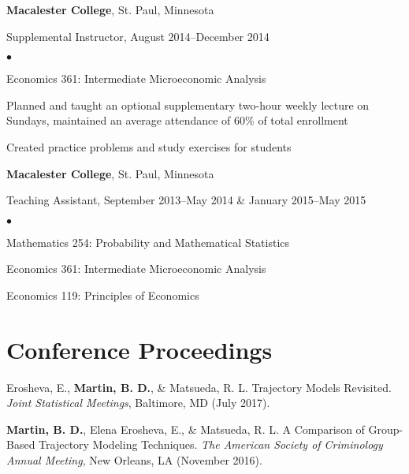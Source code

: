 \documentclass[margin,centered]{res}
\newenvironment{list1}{
  \begin{list}{\ding{113}}{%
      \setlength{\itemsep}{0in}
      \setlength{\parsep}{0in} \setlength{\parskip}{0in}
      \setlength{\topsep}{0in} \setlength{\partopsep}{0in}
      \setlength{\leftmargin}{0.17in}}}{\end{list}}
\newenvironment{list2}{
  \begin{list}{$\bullet$}{%
      \setlength{\itemsep}{0in}
      \setlength{\parsep}{0in} \setlength{\parskip}{0in}
      \setlength{\topsep}{0in} \setlength{\partopsep}{0in}
      \setlength{\leftmargin}{0.2in}}}{\end{list}}
\begin{document}
\begin{resume}
{\bf Macalester College}, St. Paul, Minnesota
\begin{list1}
\item[] Supplemental Instructor, August 2014--December 2014
\begin{list2}
\vspace*{.05in}
\item Economics 361: Intermediate Microeconomic Analysis
\item Planned and taught an optional supplementary two-hour weekly lecture on Sundays, maintained an average attendance of 60\% of total enrollment
\item Created practice problems and study exercises for students
\end{list2}
\end{list1}

{\bf Macalester College}, St. Paul, Minnesota
\begin{list1}
\item[] Teaching Assistant, September 2013--May 2014 \& January 2015--May 2015
\begin{list2}
\vspace*{.05in}
\item Mathematics 254: Probability and Mathematical Statistics
\item Economics 361: Intermediate Microeconomic Analysis
\item Economics 119: Principles of Economics
\end{list2}
\end{list1}


\section{\sc Conference Proceedings}
Erosheva, E., \textbf{Martin, B. D.}, \& Matsueda, R. L. Trajectory Models Revisited. \textit{Joint Statistical Meetings}, Baltimore, MD (July 2017).

\textbf{Martin, B. D.}, Elena Erosheva, E., \& Matsueda, R. L. A Comparison of Group-Based Trajectory Modeling Techniques. \textit{The American Society of Criminology Annual Meeting}, New Orleans, LA (November 2016).


\end{resume}
\end{document}
